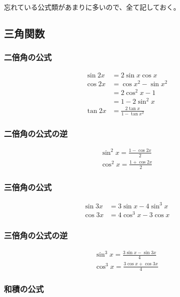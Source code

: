 \documentclass[a4paper, 10pt, dvipdfmx]{jlreq}
\begin{document}
忘れている公式類があまりに多いので、全て記しておく。

\subsection{三角関数}

\subsubsection{二倍角の公式}

\begin{align*}
  \sin{2x} & =2\sin{x}\cos{x}              \\
  \cos{2x} & =\cos{x}^2-\sin{x}^2          \\
           & =2\cos^2{x}-1                 \\
           & =1-2\sin^2{x}                 \\
  \tan{2x} & =\frac{2\tan{x}}{1-\tan{x}^2}
\end{align*}

\subsubsection{二倍角の公式の逆}

\begin{align*}
  \sin^2{x}=\frac{1-\cos{2x}}{2} \\
  \cos^2{x}=\frac{1+\cos{2x}}{2}
\end{align*}

\subsubsection{三倍角の公式}

\begin{align*}
  \sin{3x} & =3\sin{x}-4\sin^3{x} \\
  \cos{3x} & =4\cos^3{x}-3\cos{x}
\end{align*}

\subsubsection{三倍角の公式の逆}

\begin{align*}
  \sin^3{x}=\frac{3\sin{x}-\sin{3x}}{4} \\
  \cos^3{x}=\frac{3\cos{x}+\cos{3x}}{4}
\end{align*}

\subsubsection{和積の公式}
\end{document}

